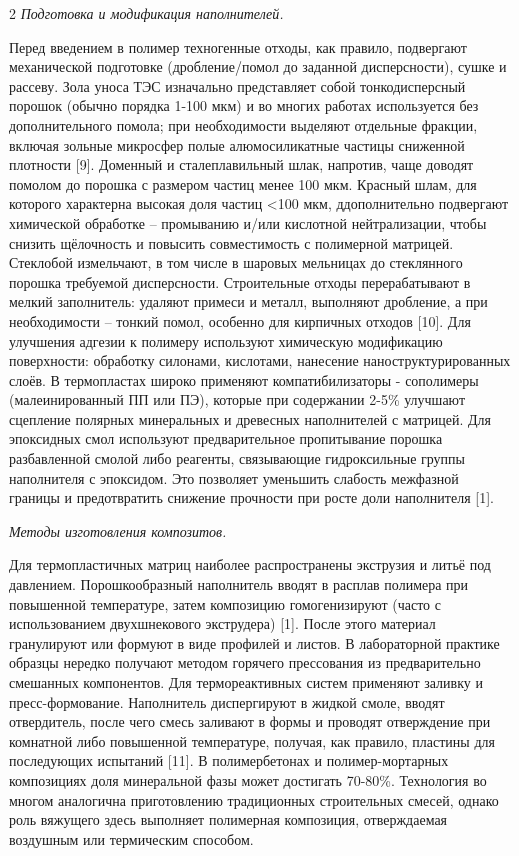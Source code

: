 \begin{multicols}{2}
\emph{Подготовка и модификация наполнителей.}

Перед введением в полимер техногенные отходы, как правило, подвергают
механической подготовке (дробление/помол до заданной дисперсности),
сушке и рассеву. Зола уноса ТЭС изначально представляет собой
тонкодисперсный порошок (обычно порядка 1-100 мкм) и во многих работах
используется без дополнительного помола; при необходимости выделяют
отдельные фракции, включая зольные микросфер полые алюмосиликатные
частицы сниженной плотности {[}9{]}. Доменный и сталеплавильный шлак,
напротив, чаще доводят помолом до порошка с размером частиц менее 100
мкм. Красный шлам, для которого характерна высокая доля частиц
<100 мкм, ддополнительно подвергают химической обработке --
промыванию и/или кислотной нейтрализации, чтобы снизить щёлочность и
повысить совместимость с полимерной матрицей. Стеклобой измельчают, в
том числе в шаровых мельницах до стеклянного порошка требуемой
дисперсности. Строительные отходы перерабатывают в мелкий заполнитель:
удаляют примеси и металл, выполняют дробление, а при необходимости --
тонкий помол, особенно для кирпичных отходов {[}10{]}. Для улучшения
адгезии к полимеру используют химическую модификацию поверхности:
обработку силонами, кислотами, нанесение наноструктурированных слоёв. В
термопластах широко применяют компатибилизаторы - сополимеры
(малеинированный ПП или ПЭ), которые при содержании 2-5\% улучшают
сцепление полярных минеральных и древесных наполнителей с матрицей. Для
эпоксидных смол используют предварительное пропитывание порошка
разбавленной смолой либо реагенты, связывающие гидроксильные группы
наполнителя с эпоксидом. Это позволяет уменьшить слабость межфазной
границы и предотвратить снижение прочности при росте доли наполнителя
{[}1{]}.

\emph{Методы изготовления композитов.}

Для термопластичных матриц наиболее распространены экструзия и литьё под
давлением. Порошкообразный наполнитель вводят в расплав полимера при
повышенной температуре, затем композицию гомогенизируют (часто с
использованием двухшнекового экструдера) {[}1{]}. После этого материал
гранулируют или формуют в виде профилей и листов. В лабораторной
практике образцы нередко получают методом горячего прессования из
предварительно смешанных компонентов. Для термореактивных систем
применяют заливку и пресс-формование. Наполнитель диспергируют в жидкой
смоле, вводят отвердитель, после чего смесь заливают в формы и проводят
отверждение при комнатной либо повышенной температуре, получая, как
правило, пластины для последующих испытаний {[}11{]}. В полимербетонах и
полимер-мортарных композициях доля минеральной фазы может достигать
70-80\%. Технология во многом аналогична приготовлению традиционных
строительных смесей, однако роль вяжущего здесь выполняет полимерная
композиция, отверждаемая воздушным или термическим способом.


\end{multicols}
